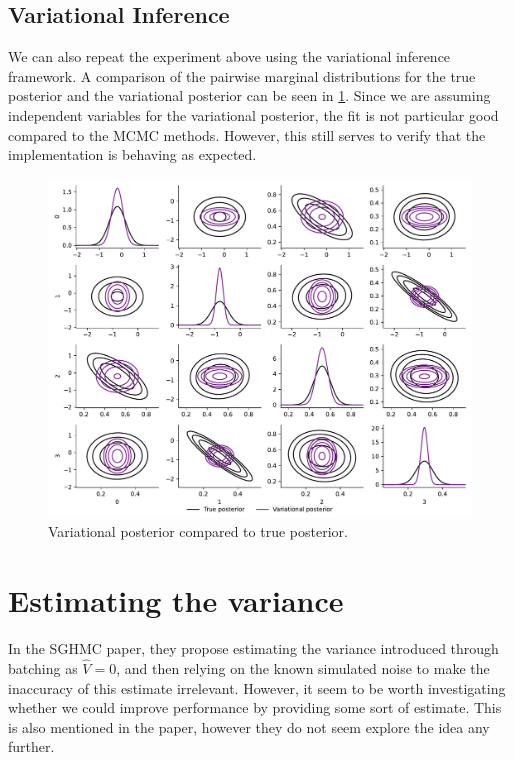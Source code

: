 \subsection{Variational Inference} 
We can also repeat the experiment above using the variational inference framework.
A comparison of the pairwise marginal distributions for the true posterior and the variational posterior can be seen in \cref{fig:vi-simulated}. 
Since we are assuming independent variables for the variational posterior, the fit is not particular good compared to the MCMC methods. 
However, this still serves to verify that the implementation is behaving as expected.
\begin{figure}[htbp]
    \centering
    \includegraphics[width=\linewidth]{Figures/vi-simulated.pdf}
    \caption{Variational posterior compared to true posterior.}
    \label{fig:vi-simulated}
\end{figure}


\section{Estimating the variance}

In the SGHMC paper, they propose estimating the variance introduced through batching as $\hat{V}=0$, and then relying on the known simulated noise to make the inaccuracy of this estimate irrelevant. 
However, it seem to be worth investigating whether we could improve performance by providing some sort of estimate. 
This is also mentioned in the paper, however they do not seem explore the idea any further. 

